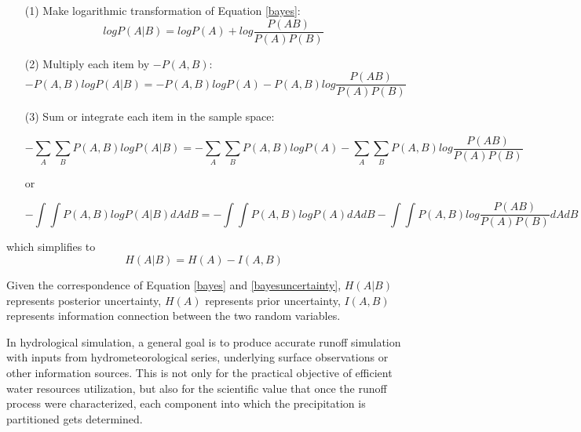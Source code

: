 \documentclass[draft,wrr]{AGUTeX}
\begin{document}
\begin{article}
\begin{itemize}
\item[(1)] Make logarithmic transformation of Equation \ref{bayes}:
\begin{equation}
\label{log}
logP(A|B) =logP(A)+log \frac{P (AB)}{P(A)P(B)} 
\end{equation}
\item[(2)] Multiply each item by $-P(A,B)$:
\begin{equation}
\label{element}
-P(A,B)logP(A|B) =-P(A,B) logP(A)-P(A,B) log \frac{P (AB)}{P(A)P(B)} 
\end{equation} 
\item[(3)] Sum or integrate each item in the sample space:
\begin{small}
\begin{equation}
\label{element1}
-\sum_{A} \sum_{B} P(A,B)logP(A|B) =-\sum_{A} \sum_{B} P(A,B) logP(A)-\sum_{A} \sum_{B} P(A,B) log \frac{P (AB)}{P(A)P(B)} 
\end{equation} 
\end{small}
or
\begin{small}
\begin{equation}
\label{element2}
-\int\int P(A,B)logP(A|B)dAdB =-\int \int P(A,B)logP(A)dAdB -\int \int P(A,B)log \frac{P (AB)}{P(A)P(B)}dAdB
\end{equation}
\end{small}
\end{itemize}
which simplifies to  
\begin{equation}
\label{bayesuncertainty}
H(A|B) = H(A)-I(A,B)
\end{equation}

Given the correspondence of  Equation \eqref{bayes} and \eqref{bayesuncertainty}, $H(A|B)$  represents posterior uncertainty, $H(A)$ represents prior uncertainty, $I(A,B)$ represents information connection between the two random variables. 

In hydrological simulation, a general goal is to produce accurate runoff simulation with inputs from hydrometeorological series, underlying surface observations or other information sources. This is not only for the practical objective of efficient water resources utilization, but also for the scientific value that once the runoff process were characterized, each component into which the precipitation is partitioned gets determined. 


\end{article}
\end{document}
